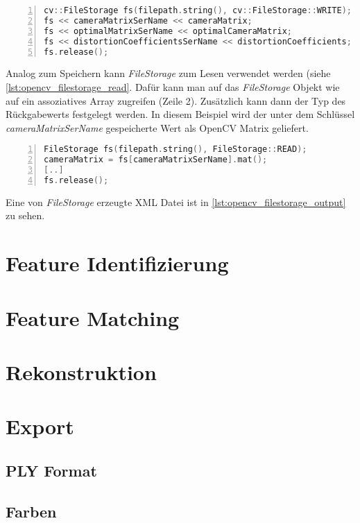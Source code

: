 \begin{lstlisting}[language=c++, numbers=left, breaklines=true, breakatwhitespace=false, label=lst:opencv_filestorage, caption=Schreiben mit OpenCV Filestorage]
cv::FileStorage fs(filepath.string(), cv::FileStorage::WRITE);
fs << cameraMatrixSerName << cameraMatrix;
fs << optimalMatrixSerName << optimalCameraMatrix;
fs << distortionCoefficientsSerName << distortionCoefficients;
fs.release();
\end{lstlisting}

Analog zum Speichern kann \emph{FileStorage} zum Lesen verwendet werden (siehe \autoref{lst:opencv_filestorage_read}.
Dafür kann man auf das \emph{FileStorage} Objekt wie auf ein assoziatives Array zugreifen (Zeile 2).
Zusätzlich kann dann der Typ des Rückgabewerts festgelegt werden.
In diesem Beispiel wird der unter dem Schlüssel \emph{cameraMatrixSerName} gespeicherte Wert als OpenCV Matrix geliefert.

\begin{lstlisting}[language=c++, numbers=left, breaklines=true, breakatwhitespace=false, label=lst:opencv_filestorage_read, caption=Lesen mit OpenCV Filestorage]
FileStorage fs(filepath.string(), FileStorage::READ);
cameraMatrix = fs[cameraMatrixSerName].mat();
[..]
fs.release();
\end{lstlisting}


Eine von \emph{FileStorage} erzeugte XML Datei ist in \autoref{lst:opencv_filestorage_output} zu sehen.




\section{Feature Identifizierung}

\section{Feature Matching}

\section{Rekonstruktion}

\section{Export}
\subsection{PLY Format}
\subsection{Farben}
